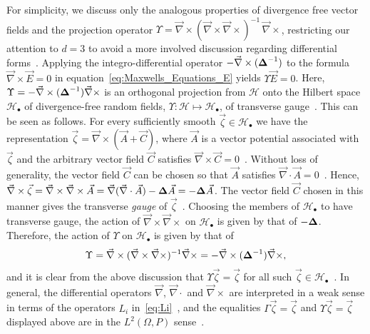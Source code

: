 \documentclass{cmslatex}
\newcommand\bDelta{\mbox{\boldmath${\Delta}$}}
\begin{document}
For simplicity, we discuss only the analogous properties of divergence
free vector fields and the projection operator
$\Upsilon=\vec{\nabla}\times(\vec{\nabla}\times\vec{\nabla}\times)^{-1}\,\vec{\nabla}\times$, restricting our
attention to $d=3$ to avoid a more involved discussion regarding
differential forms~\cite{Darling:Differential_Forms:1994}.
Applying the integro-differential
operator $-\vec{\nabla}\times(\bDelta^{-1})$ to the formula
$\vec{\nabla}\times\vec{E}=0$ in equation~\eqref{eq:Maxwells_Equations_E} yields  
$\Upsilon\vec{E}=0$. Here, $\Upsilon=-\vec{\nabla}\times(\bDelta^{-1})\vec{\nabla}\times$ is an
orthogonal projection from $\mathscr{H}$ onto the Hilbert space 
$\mathscr{H}_{\bullet}$ of divergence-free random fields,
$\Upsilon:\mathscr{H}\mapsto\mathscr{H}_\bullet$, of transverse
gauge~\cite{Murphy:JMP:063506}. This can be seen as follows. For every 
sufficiently smooth $\vec{\zeta}\in\mathscr{H}_\bullet$ we have the representation
$\vec{\zeta}=\vec{\nabla}\times(\vec{A}+\vec{C})$, where $\vec{A}$ is a vector
potential associated with $\vec{\zeta}$ and the arbitrary vector field
$\vec{C}$ satisfies $\vec{\nabla}\times\vec{C}=0$~\cite{Jackson-1999}. Without
loss of generality, the vector field $\vec{C}$ can be chosen so that
$\vec{A}$ satisfies $\vec{\nabla}\cdot\vec{A}=0$~\cite{Jackson-1999}. Hence,
$\vec{\nabla}\times\vec{\zeta}=\vec{\nabla}\times\vec{\nabla}\times\vec{A}
=\vec{\nabla}(\vec{\nabla}\cdot\vec{A})-\bDelta\vec{A}=-\bDelta\vec{A}$. The vector field
$\vec{C}$ chosen in this manner gives the transverse \emph{gauge} of
$\vec{\zeta}$~\cite{Jackson-1999}. Choosing the members of 
$\mathscr{H}_\bullet$ to have transverse gauge, the action of
$\vec{\nabla}\times\vec{\nabla}\times$ on $\mathscr{H}_\bullet$ is given by that of
$-\bDelta$. Therefore, the action of $\Upsilon$ on $\mathscr{H}_\bullet$ is given
by that of 
%
\begin{align}\label{eq:GammaCurl}
  \Upsilon=\vec{\nabla}\times(\vec{\nabla}\times\vec{\nabla}\times)^{-1}\vec{\nabla}\times
  =-\vec{\nabla}\times(\bDelta^{-1})\vec{\nabla}\times, 
\end{align}
%
and it is clear from the above discussion that $\Upsilon\vec{\zeta}=\vec{\zeta}$ for
all such
$\vec{\zeta}\in\mathscr{H}_\bullet$~\cite{Folland:95,Stakgold:BVP:2000}. In
general, the differential  
operators $\vec{\nabla}$, $\vec{\nabla}\cdot$ and $\vec{\nabla}\times$ are interpreted
in a weak sense in terms of the operators $L_i$
in~\eqref{eq:Li}~\cite{Golden:CMP-473}, and the equalities
$\Gamma\vec{\zeta}=\vec{\zeta}$ and 
$\Upsilon\vec{\zeta}=\vec{\zeta}$ displayed above are in the $L^2(\Omega,P)$
sense~\cite{Folland:95,Stakgold:BVP:2000}.  
\end{document}
